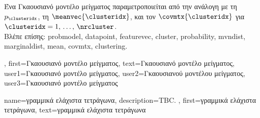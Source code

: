 {{\begin{figure}[H]
\begin{center}
		\end{center}
		\end{figure}
		\foreignlanguage{greek}{Ένα Γκαουσιανό μοντέλο μείγματος παραμετροποιείται από την ανάλογη με τη}  
		 $p_{\clusteridx}$, \foreignlanguage{greek}{τη}  $\meanvec{\clusteridx}$, 
		\foreignlanguage{greek}{και τον}  $\covmtx{\clusteridx}$ \foreignlanguage{greek}{για} $\clusteridx=1,\,\ldots,\,\nrcluster$.
		\\
		\foreignlanguage{greek}{Βλέπε επίσης:} \gls{probmodel}, \gls{datapoint}, \gls{featurevec}, \gls{cluster}, \gls{probability}, 
		\gls{mvndist}, \gls{marginaldist}, \gls{mean}, \gls{covmtx}, \gls{clustering}. },
	first={\foreignlanguage{greek}{Γκαουσιανό μοντέλο μείγματος}},
	text={\foreignlanguage{greek}{Γκαουσιανό μοντέλο μείγματος}},
	user1={\foreignlanguage{greek}{Γκαουσιανό μοντέλο μείγματος}}, %
  	user2={\foreignlanguage{greek}{Γκαουσιανού μοντέλου μείγματος}}, %
	user3={\foreignlanguage{greek}{Γκαουσιανό μοντέλο μείγματος}} %
}%

{name={\foreignlanguage{greek}{γραμμικά ελάχιστα τετράγωνα}},
	description={TBC. },
	first={\foreignlanguage{greek}{γραμμικά ελάχιστα τετράγωνα}},
	text={\foreignlanguage{greek}{γραμμικά ελάχιστα τετράγωνα}}
}

